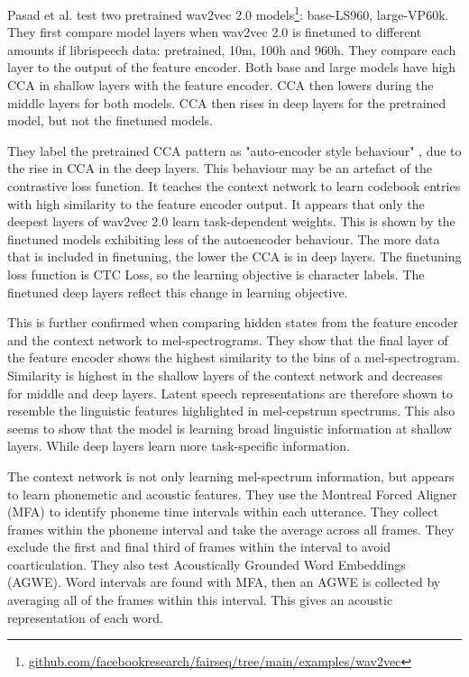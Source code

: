 Pasad et al. \cite{pasad2021layer} test two pretrained wav2vec 2.0 models\footnote{\hyperlink{https://github.com/facebookresearch/fairseq/tree/main/examples/wav2vec}{github.com/facebookresearch/fairseq/tree/main/examples/wav2vec}\label{lr_la_fn:w2v2}}: base-LS960, large-VP60k. They first compare model layers when wav2vec 2.0 is finetuned to different amounts if librispeech data: pretrained, 10m, 100h and 960h. They compare each layer to the output of the feature encoder. Both base and large models have high CCA in shallow layers with the feature encoder. CCA then lowers during the middle layers for both models. CCA then rises in deep layers for the pretrained model, but not the finetuned models. 

They label the pretrained CCA pattern as "auto-encoder style behaviour" \cite{pasad2021layer}, due to the rise in CCA in the deep layers. This behaviour may be an artefact of the contrastive loss function. It teaches the context network to learn codebook entries with high similarity to the feature encoder output. It appears that only the deepest layers of wav2vec 2.0 learn task-dependent weights. This is shown by the finetuned models exhibiting less of the autoencoder behaviour. The more data that is included in finetuning, the lower the CCA is in deep layers. The finetuning loss function is CTC Loss, so the learning objective is character labels. The finetuned deep layers reflect this change in learning objective.

This is further confirmed when comparing hidden states from the feature encoder and the context network to mel-spectrograms. They show that the final layer of the feature encoder shows the highest similarity to the bins of a mel-spectrogram. Similarity is highest in the shallow layers of the context network and decreases for middle and deep layers. Latent speech representations are therefore shown to resemble the linguistic features highlighted in mel-cepstrum spectrums. This also seems to show that the model is learning broad linguistic information at shallow layers. While deep layers learn more task-specific information.

The context network is not only learning mel-spectrum information, but appears to learn phonemetic and acoustic features. They use the Montreal Forced Aligner (MFA) to identify phoneme time intervals within each utterance. They collect frames within the phoneme interval and take the average across all frames. They exclude the first and final third of frames within the interval to avoid coarticulation. They also test Acoustically Grounded Word Embeddings (AGWE). Word intervals are found with MFA, then an AGWE is collected by averaging all of the frames within this interval. This gives an acoustic representation of each word.

